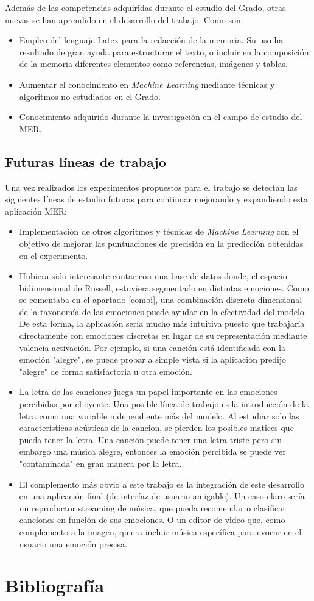 \documentclass[12pt,a4paper,Spanish]{article}
\begin{document}
Además de las competencias adquiridas durante el estudio del Grado, otras nuevas se han aprendido en el desarrollo del trabajo. Como son:
\begin{itemize}
	\item Empleo del lenguaje Latex para la redacción de la memoria. Su uso ha resultado de gran ayuda para estructurar el texto, o incluir en la composición de la memoria diferentes elementos como referencias, imágenes y tablas.
	\item Aumentar el conocimiento en \textit{Machine Learning} mediante técnicas y algoritmos no estudiados en el Grado.
	\item Conocimiento adquirido durante la investigación en el campo de estudio del MER.
\end{itemize}
\subsection{Futuras líneas de trabajo}

Una vez realizados los experimentos propuestos para el trabajo se detectan las siguientes líneas de estudio futuras para continuar mejorando y expandiendo esta aplicación MER:
\begin{itemize}
	\item Implementación de otros algoritmos y técnicas de \textit{Machine Learning} con el objetivo de mejorar las puntuaciones de precisión en la predicción obtenidas en el experimento.
	\item Hubiera sido interesante contar con una base de datos donde, el espacio bidimensional de Russell, estuviera segmentado en distintas emociones. Como se comentaba en el apartado \ref{combi}, una combinación discreta-dimensional de la taxonomía de las emociones puede ayudar en la efectividad del modelo. De esta forma, la aplicación sería mucho más intuitiva puesto que trabajaría directamente con emociones discretas en lugar de su representación mediante valencia-activación. Por ejemplo, si una canción está identificada con la emoción "alegre", se puede probar a simple vista si la aplicación predijo "alegre" de forma satisfactoria u otra emoción.
	\item La letra de las canciones juega un papel importante en las emociones percibidas por el oyente. Una posible línea de trabajo es la introducción de la letra como una variable independiente más del modelo. Al estudiar solo las características acústicas de la cancion, se pierden los posibles matices que pueda tener la letra. Una canción puede tener una letra triste pero sin embargo una música alegre, entonces la emoción percibida se puede ver "contaminada" en gran manera por la letra.
	\item El complemento más obvio a este trabajo es la integración de este desarrollo en una aplicación final (de interfaz de usuario amigable). Un caso claro sería un reproductor streaming de música, que pueda recomendar o clasificar canciones en función de sus emociones. O un editor de video que, como complemento a la imagen, quiera incluir música específica para evocar en el usuario una emoción precisa.
\end{itemize}





\newpage
\section{Bibliografía}
\printbibliography[heading=none]
\end{document}
